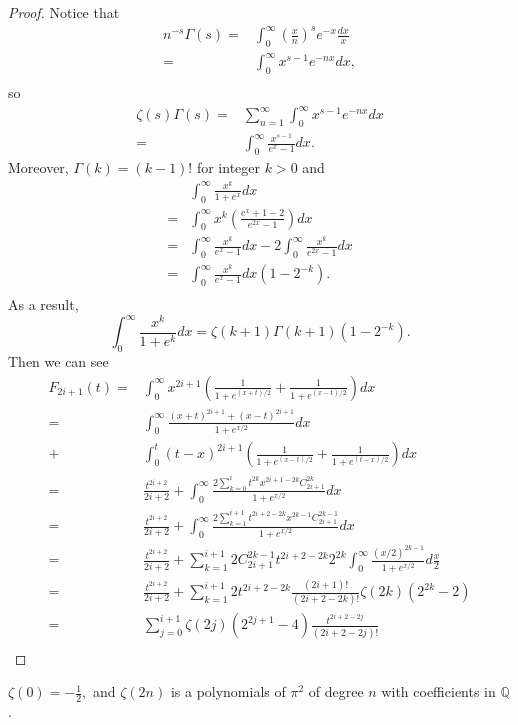\begin{proof}
Notice that $$
\begin{aligned}
n^{-s}\Gamma(s)=&\int_0^\infty (\frac{x}{n})^{s}e^{-x}\frac{dx}{x}\\
=&\int_0^\infty x^{s-1}e^{-nx}dx,\\
\end{aligned}
$$
so $$
\begin{aligned}
\zeta(s)\Gamma(s)=&\sum_{n=1}^\infty\int_0^\infty x^{s-1}e^{-nx}dx\\
=&\int_0^\infty \frac{x^{s-1}}{e^x-1}dx.
\end{aligned}
$$
Moreover, $\Gamma(k)=(k-1)!$ for integer $k>0$ and $$\begin{aligned}
&\int_0^\infty \frac{x^{k}}{1+e^x}dx \\
=&\int_0^\infty x^k(\frac{e^x+1-2}{e^{2x}-1})dx\\
=&\int_0^\infty \frac{x^k}{e^x-1}dx-2\int_0^\infty \frac{x^k}{e^{2x}-1}dx\\
=&\int_0^\infty \frac{x^k}{e^x-1}dx(1-2^{-k}).\\
\end{aligned}
$$
As a result, $$
\int_0^\infty \frac{x^k}{1+e^k}dx=\zeta(k+1)\Gamma(k+1)(1-2^{-k}).
$$
Then we can see $$
\begin{aligned}
F_{2i+1}(t)=&\int_0^\infty x^{2i+1}(\frac{1}{1+e^{(x+t)/2}}+\frac{1}{1+e^{(x-t)/2}})dx\\
=&\int_0^\infty \frac{(x+t)^{2i+1}+(x-t)^{2i+1}}{1+e^{x/2}}dx\\
+&\int_0^t(t-x)^{2i+1}(\frac{1}{1+e^{(x-t)/2}}+\frac{1}{1+e^{(t-x)/2}})dx\\
=&\frac{t^{2i+2}}{2i+2}+\int_0^\infty\frac{2\sum_{k=0}^i t^{2k}x^{2i+1-2k}C_{2i+1}^{2k}}{1+e^{x/2}}dx\\
=&\frac{t^{2i+2}}{2i+2}+\int_0^\infty\frac{2\sum_{k=1}^{i+1} t^{2i+2-2k}x^{2k-1}C_{2i+1}^{2k-1}}{1+e^{x/2}}dx\\
=&\frac{t^{2i+2}}{2i+2}+\sum_{k=1}^{i+1} 2C_{2i+1}^{2k-1} t^{2i+2-2k}2^{2k}\int_0^\infty\frac{(x/2)^{2k-1}}{1+e^{x/2}}d\frac{x}{2}\\
=&\frac{t^{2i+2}}{2i+2}+\sum_{k=1}^{i+1}2t^{2i+2-2k}\frac{(2i+1)!}{(2i+2-2k)!}\zeta(2k)(2^{2k}-2)\\
=&\sum_{j=0}^{i+1}\zeta(2j)(2^{2j+1}-4)\frac{t^{2i+2-2j}}{(2i+2-2j)!}\\
\end{aligned}
$$
\end{proof}

\begin{remark}
 $\zeta(0)=-\frac{1}{2},$ and $\zeta(2n)$ is a polynomials of $\pi^{2}$ of degree $n$ with coefficients in  $\mathbb{Q}$.
\end{remark}





